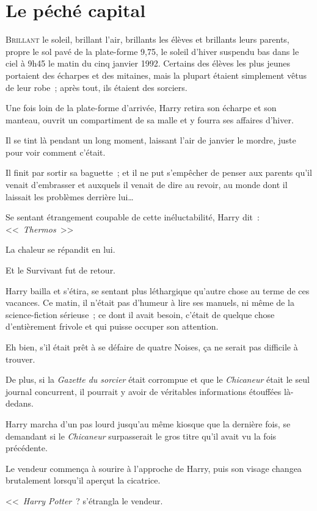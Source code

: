 \chapter{Le péché capital}

\lettrine{B}{rillant} le soleil, brillant l'air, brillants les élèves et brillants leurs parents, propre le sol pavé de la plate-forme 9,75, le soleil d'hiver suspendu bas dans le ciel à 9h45 le matin du cinq janvier 1992. Certains des élèves les plus jeunes portaient des écharpes et des mitaines, mais la plupart étaient simplement vêtus de leur robe~; après tout, ils étaient des sorciers.

Une fois loin de la plate-forme d'arrivée, Harry retira son écharpe et son manteau, ouvrit un compartiment de sa malle et y fourra ses affaires d'hiver.

Il se tint là pendant un long moment, laissant l'air de janvier le mordre, juste pour voir comment c'était.

Il finit par sortir sa baguette~; et il ne put s'empêcher de penser aux parents qu'il venait d'embrasser et auxquels il venait de dire au revoir, au monde dont il laissait les problèmes derrière lui…

Se sentant étrangement coupable de cette inéluctabilité, Harry dit~: <<~\emph{Thermos}~>>

La chaleur se répandit en lui.

Et le Survivant fut de retour.

Harry bailla et s'étira, se sentant plus léthargique qu'autre chose au terme de ces vacances. Ce matin, il n'était pas d'humeur à lire ses manuels, ni même de la science-fiction sérieuse~; ce dont il avait besoin, c'était de quelque chose d'entièrement frivole et qui puisse occuper son attention.

Eh bien, s'il était prêt à se défaire de quatre Noises, ça ne serait pas difficile à trouver.

De plus, si la \emph{Gazette du sorcier} était corrompue et que le \emph{Chicaneur} était le seul journal concurrent, il pourrait y avoir de véritables informations étouffées là-dedans.

Harry marcha d'un pas lourd jusqu'au même kiosque que la dernière fois, se demandant si le \emph{Chicaneur} surpasserait le gros titre qu'il avait vu la fois précédente.

Le vendeur commença à sourire à l'approche de Harry, puis son visage changea brutalement lorsqu'il aperçut la cicatrice.

<<~\emph{Harry Potter}~? s'étrangla le vendeur.


